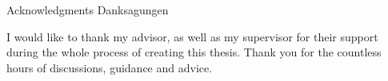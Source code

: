 \makeatletter
{}
{}
{}
\makeatother
\thispagestyle{empty}

\vspace*{20mm}

\begin{center}
\makeatletter
{}
{ Acknowledgments}
{ Danksagungen}
\makeatother
\end{center}

\vspace{10mm}

\begin{center}
I would like to thank my advisor, \getAdvisor \space as well as my supervisor \getSupervisor \space for their support during the whole process of creating this thesis. Thank you for the countless hours of discussions, guidance and advice.
\end{center}

\cleardoublepage{}
